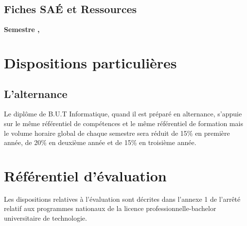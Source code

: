 \documentclass[10pt]{article}
\begin{document}
\subsection{Fiches SAÉ et Ressources}

\textbf{Semestre , }\\
\par
\section{Dispositions particulières}
\subsection{L'alternance}
Le diplôme de B.U.T Informatique, quand il est préparé en alternance,
s’appuie sur le même référentiel de compétences et le même
référentiel de formation mais le volume horaire global de chaque
semestre sera réduit de 15\% en première année, de 20\% en
deuxième année et de 15\% en troisième année.
\section{Référentiel d’évaluation}
Les dispositions relatives à l’évaluation sont décrites dans l’annexe 1
de l’arrêté relatif aux programmes nationaux de la licence
professionnelle-bachelor universitaire de technologie.
\end{document}
